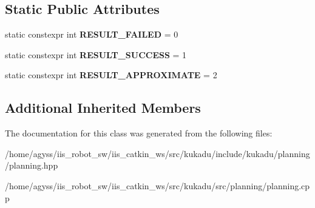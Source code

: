 \subsection*{Static Public Attributes}
\begin{DoxyCompactItemize}
\item 
static constexpr int {\bfseries R\+E\+S\+U\+L\+T\+\_\+\+F\+A\+I\+L\+ED} = 0\hypertarget{classkukadu_1_1PathPlanner_acb48a2d0a667f922536bbac8699451e8}{}\label{classkukadu_1_1PathPlanner_acb48a2d0a667f922536bbac8699451e8}

\item 
static constexpr int {\bfseries R\+E\+S\+U\+L\+T\+\_\+\+S\+U\+C\+C\+E\+SS} = 1\hypertarget{classkukadu_1_1PathPlanner_a805c234a0fcbfb17a328893aced1439a}{}\label{classkukadu_1_1PathPlanner_a805c234a0fcbfb17a328893aced1439a}

\item 
static constexpr int {\bfseries R\+E\+S\+U\+L\+T\+\_\+\+A\+P\+P\+R\+O\+X\+I\+M\+A\+TE} = 2\hypertarget{classkukadu_1_1PathPlanner_a47cbdf0417d30f68abddf6d051a3ba41}{}\label{classkukadu_1_1PathPlanner_a47cbdf0417d30f68abddf6d051a3ba41}

\end{DoxyCompactItemize}
\subsection*{Additional Inherited Members}


The documentation for this class was generated from the following files\+:\begin{DoxyCompactItemize}
\item 
/home/agyss/iis\+\_\+robot\+\_\+sw/iis\+\_\+catkin\+\_\+ws/src/kukadu/include/kukadu/planning/planning.\+hpp\item 
/home/agyss/iis\+\_\+robot\+\_\+sw/iis\+\_\+catkin\+\_\+ws/src/kukadu/src/planning/planning.\+cpp\end{DoxyCompactItemize}
